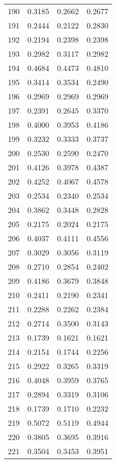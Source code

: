 \begin{table}[ht]
\begin{tabular}{|c|c|c|c|}
190  &  0.3185   &  0.2662   &  0.2677 \\ 
191  &  0.2444   &  0.2122   &  0.2830 \\ 
192  &  0.2194   &  0.2398   &  0.2398 \\ 
193  &  0.2982   &  0.3117   &  0.2982 \\ 
194  &  0.4684   &  0.4473   &  0.4810 \\ 
195  &  0.3414   &  0.3534   &  0.2490 \\ 
196  &  0.2969   &  0.2969   &  0.2969 \\ 
197  &  0.2391   &  0.2645   &  0.3370 \\ 
198  &  0.4000   &  0.3953   &  0.4186 \\ 
199  &  0.3232   &  0.3333   &  0.3737 \\ 
200  &  0.2530   &  0.2590   &  0.2470 \\ 
201  &  0.4126   &  0.3978   &  0.4387 \\ 
202  &  0.4252   &  0.4067   &  0.4578 \\ 
203  &  0.2534   &  0.2340   &  0.2534 \\ 
204  &  0.3862   &  0.3448   &  0.2828 \\ 
205  &  0.2175   &  0.2024   &  0.2175 \\ 
206  &  0.4037   &  0.4111   &  0.4556 \\ 
207  &  0.3029   &  0.3056   &  0.3119 \\ 
208  &  0.2710   &  0.2854   &  0.2402 \\ 
209  &  0.4186   &  0.3679   &  0.3848 \\ 
210  &  0.2411   &  0.2190   &  0.2341 \\ 
211  &  0.2288   &  0.2262   &  0.2384 \\ 
212  &  0.2714   &  0.3500   &  0.3143 \\ 
213  &  0.1739   &  0.1621   &  0.1621 \\ 
214  &  0.2154   &  0.1744   &  0.2256 \\ 
215  &  0.2922   &  0.3265   &  0.3319 \\ 
216  &  0.4048   &  0.3959   &  0.3765 \\ 
217  &  0.2894   &  0.3319   &  0.3106 \\ 
218  &  0.1739   &  0.1710   &  0.2232 \\ 
219  &  0.5072   &  0.5119   &  0.4944 \\ 
220  &  0.3805   &  0.3695   &  0.3916 \\ 
221  &  0.3504   &  0.3453   &  0.3951 \\ 

\end{tabular}
\end{table}
